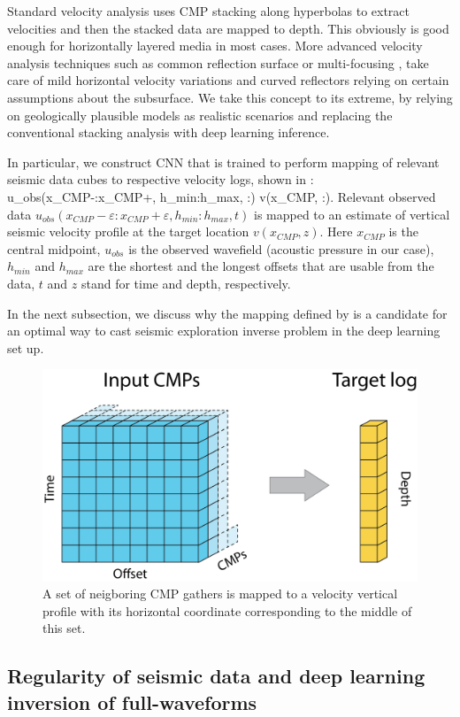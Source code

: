 \documentclass[paper,twocolomn]{geophysics}
\begin{document}
Standard velocity analysis uses CMP stacking along hyperbolas to extract velocities and then the stacked data are mapped to depth. This obviously is good enough for horizontally layered media in most cases. More advanced velocity analysis techniques such as common reflection surface  \citep{mann1999common} or multi-focusing \citep{gelchinsky1999multifocusing}, take care of mild horizontal velocity variations and curved reflectors relying on certain assumptions about the subsurface. We take this concept to its extreme, by relying on geologically plausible models as realistic scenarios and replacing the conventional stacking analysis with deep learning inference.

In particular, we construct CNN that is trained to perform mapping of relevant seismic data cubes to respective velocity logs, shown in : 
\beq \label{eq:mapping}
u_{obs}(x_{CMP}-\varepsilon:x_{CMP}+\varepsilon, h_{min}:h_{max}, :) \to v(x_{CMP}, :).
\eeq
Relevant observed data $u_{obs}(x_{CMP}-\varepsilon:x_{CMP}+\varepsilon, h_{min}:h_{max}, t)$ is mapped
to an estimate of vertical seismic velocity profile at the target location $v(x_{CMP}, z)$. Here $x_{CMP}$ is the central midpoint,
$u_{obs}$ is the observed wavefield (acoustic pressure in our case), 
$h_{min}$ and $h_{max}$ are the shortest and the longest offsets that are usable from the data, $t$ and $z$ stand for time and depth, respectively.

In the next subsection, we discuss why the mapping defined by  is a candidate for an optimal way to cast seismic exploration inverse problem in the deep learning set up.  
\begin{figure}[h!]
	\centering
	\includegraphics[width=0.7\linewidth]{Fig/in_out_shape}
	\caption{A set of neigboring CMP gathers is mapped to a velocity vertical profile with its horizontal coordinate corresponding to the middle of this set.}
	\label{fig:in_out}
\end{figure}

\subsection{Regularity of seismic data and deep learning inversion of full-waveforms}
\end{document}
